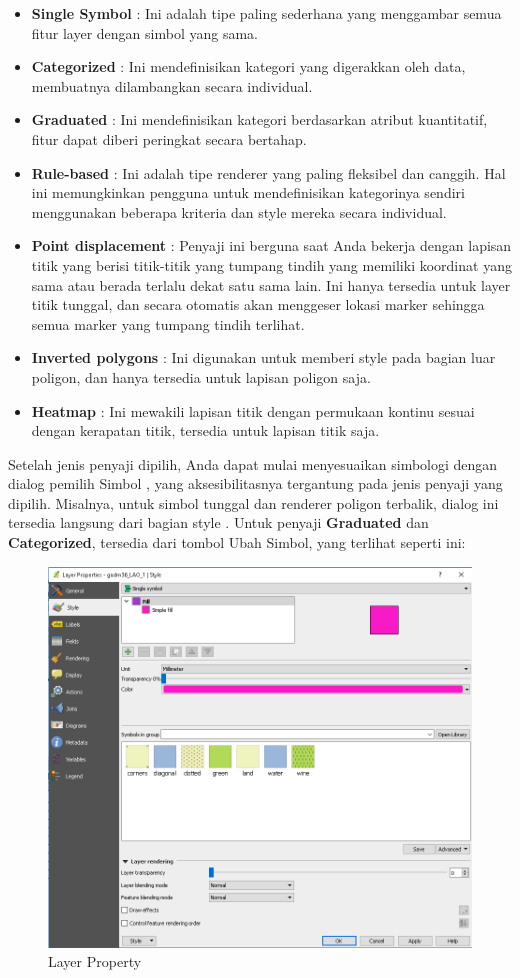 \documentclass[]{book}
\begin{document}
\begin{itemize}
\item
  \textbf{Single Symbol} : Ini adalah tipe paling sederhana yang menggambar semua fitur layer dengan simbol yang sama.
\item
  \textbf{Categorized} : Ini mendefinisikan kategori yang digerakkan oleh data, membuatnya dilambangkan secara individual.
\item
  \textbf{Graduated} : Ini mendefinisikan kategori berdasarkan atribut kuantitatif, fitur dapat diberi peringkat secara bertahap.
\item
  \textbf{Rule-based} : Ini adalah tipe renderer yang paling fleksibel dan canggih. Hal ini memungkinkan pengguna untuk mendefinisikan kategorinya sendiri menggunakan beberapa kriteria dan style mereka secara individual.
\item
  \textbf{Point displacement} : Penyaji ini berguna saat Anda bekerja dengan lapisan titik yang berisi titik-titik yang tumpang tindih yang memiliki koordinat yang sama atau berada terlalu dekat satu sama lain. Ini hanya tersedia untuk layer titik tunggal, dan secara otomatis akan menggeser lokasi marker sehingga semua marker yang tumpang tindih terlihat.
\item
  \textbf{Inverted polygons} : Ini digunakan untuk memberi style pada bagian luar poligon, dan hanya tersedia untuk lapisan poligon saja.
\item
  \textbf{Heatmap} : Ini mewakili lapisan titik dengan permukaan kontinu sesuai dengan kerapatan titik, tersedia untuk lapisan titik saja.
\end{itemize}

Setelah jenis penyaji dipilih, Anda dapat mulai menyesuaikan simbologi dengan dialog pemilih Simbol , yang aksesibilitasnya tergantung pada jenis penyaji yang dipilih. Misalnya, untuk simbol tunggal dan renderer poligon terbalik, dialog ini tersedia langsung dari bagian style . Untuk penyaji \textbf{Graduated} dan \textbf{Categorized}, tersedia dari tombol Ubah Simbol, yang terlihat seperti ini:

\begin{figure}

{\centering \includegraphics[width=0.3\linewidth]{images/09/fig92} 

}

\caption{Layer Property}\label{fig:fig92a}
\end{figure}
\end{document}
